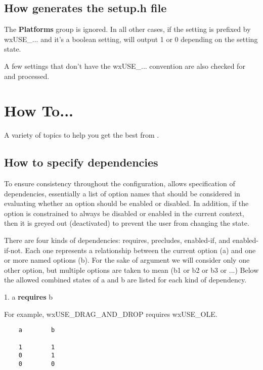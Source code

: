 \section{How \ctshortname generates the setup.h file}

The {\bf Platforms} group is ignored. In all other
cases, if the setting is prefixed by wxUSE_...
and it's a boolean setting, \ctshortname will
output 1 or 0 depending on the setting state.

A few settings that don't have the wxUSE_...
convention are also checked for and processed.


\chapter{How To...}\label{howto}%
%
\setfooter{\thepage}{}{}{}{}{\thepage}%

A variety of topics to help you get the best from \ctshortname.

\section{How to specify dependencies}\label{dependencies}

To ensure consistency throughout the configuration,
\ctshortname allows specification of dependencies, essentially
a list of option names that should be considered in evaluating
whether an option should be enabled or disabled. In addition,
if the option is constrained to always be disabled
or enabled in the current context, then it is greyed out
(deactivated) to prevent the user from changing the state.

There are four kinds of dependencies: requires, precludes,
enabled-if, and enabled-if-not. Each one represents a
relationship between the current option (a) and one
or more named options (b). For the sake of argument
we will consider only one other option, but multiple
options are taken to mean (b1 or b2 or b3 or ...)
Below the allowed combined states of a and b are
listed for each kind of dependency.

1. a {\bf requires} b

For example, wxUSE_DRAG_AND_DROP requires wxUSE_OLE.

\begin{verbatim}
    a        b

    1        1
    0        1
    0        0
\end{verbatim}

